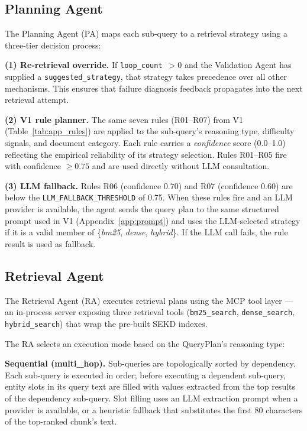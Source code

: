 \subsection{Planning Agent}
\label{subsec:v2_plan}

The Planning Agent (PA) maps each sub-query to a retrieval strategy using
a three-tier decision process:

\textbf{(1) Re-retrieval override.} If \texttt{loop\_count}~$> 0$ and the
Validation Agent has supplied a \texttt{suggested\_strategy}, that strategy
takes precedence over all other mechanisms. This ensures that failure
diagnosis feedback propagates into the next retrieval attempt.

\textbf{(2) V1 rule planner.} The same seven rules (R01--R07) from V1
(Table~\ref{tab:app_rules}) are applied to the sub-query's reasoning type,
difficulty signals, and document category. Each rule carries a
\textit{confidence} score (0.0--1.0) reflecting the empirical reliability of
its strategy selection. Rules R01--R05 fire with confidence $\geq 0.75$ and
are used directly without LLM consultation.

\textbf{(3) LLM fallback.} Rules R06 (confidence 0.70) and R07 (confidence
0.60) are below the \texttt{LLM\_FALLBACK\_THRESHOLD} of 0.75. When these
rules fire and an LLM provider is available, the agent sends the query plan
to the same structured prompt used in V1 (Appendix~\ref{app:prompt}) and
uses the LLM-selected strategy if it is a valid member of
\{\textit{bm25}, \textit{dense}, \textit{hybrid}\}. If the LLM call fails,
the rule result is used as fallback.


\subsection{Retrieval Agent}
\label{subsec:v2_retrieval}

The Retrieval Agent (RA) executes retrieval plans using the MCP
tool layer \citep{mcp2024} — an in-process server exposing three
retrieval tools (\texttt{bm25\_search}, \texttt{dense\_search},
\texttt{hybrid\_search}) that wrap the pre-built SEKD indexes.

The RA selects an execution mode based on the QueryPlan's reasoning type:

\textbf{Sequential (multi\_hop).} Sub-queries are topologically sorted by
dependency. Each sub-query is executed in order; before executing a dependent
sub-query, entity slots in its query text are filled with values extracted
from the top results of the dependency sub-query. Slot filling uses an LLM
extraction prompt when a provider is available, or a heuristic fallback that
substitutes the first 80 characters of the top-ranked chunk's text.

